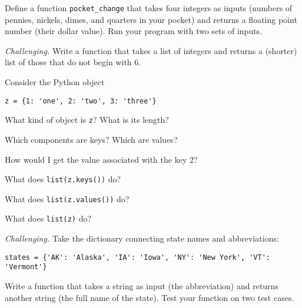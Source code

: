 \documentclass[11pt]{exam}
\begin{document}
\begin{questions}


\item Define a function \verb|pocket_change| that takes four integers as inputs 
(numbers of pennies, nickels, dimes, and quarters in your pocket)
and returns a floating point number (their dollar value).  
Run your program with two sets of inputs.  


\item {\it Challenging.\/} Write a function that takes a list of integers
and returns a (shorter) list of those that do not begin with 6.  


\item Consider the Python object
\begin{verbatim}
z = {1: 'one', 2: 'two', 3: 'three'} 
\end{verbatim} 
\begin{parts}
\item What kind of object is {\tt z}?  What is its length?  
\item Which components are keys?  Which are values? 
\item How would I get the value associated with the key 2?  
\item What does {\tt list(z.keys())} do?
\item What does {\tt list(z.values())} do?
\item What does {\tt list(z)} do?
\end{parts} 


\item {\it Challenging.\/} 
Take the dictionary connecting state names and abbreviations:
\begin{verbatim}
states = {'AK': 'Alaska', 'IA': 'Iowa', 'NY': 'New York', 'VT': 'Vermont'} 
\end{verbatim} 
Write a function that takes a string as input (the abbreviation) 
and returns another string (the full name of the state).
Test your function on two test cases.  


\end{questions}
\end{document}
